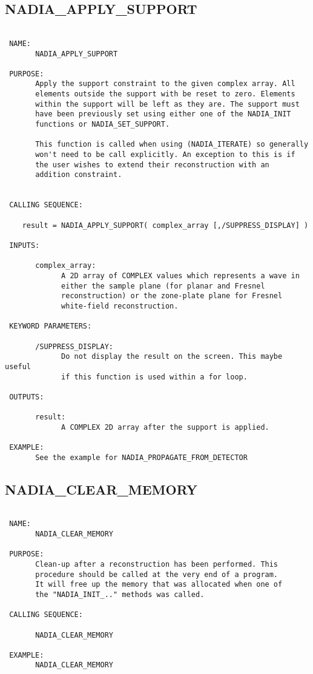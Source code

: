 \subsection{NADIA\_APPLY\_SUPPORT}
\begin{verbatim}

 NAME:
       NADIA_APPLY_SUPPORT

 PURPOSE:
       Apply the support constraint to the given complex array. All
       elements outside the support with be reset to zero. Elements
       within the support will be left as they are. The support must
       have been previously set using either one of the NADIA_INIT 
       functions or NADIA_SET_SUPPORT.

       This function is called when using (NADIA_ITERATE) so generally
       won't need to be call explicitly. An exception to this is if
       the user wishes to extend their reconstruction with an
       addition constraint.


 CALLING SEQUENCE:

	result = NADIA_APPLY_SUPPORT( complex_array [,/SUPPRESS_DISPLAY] )

 INPUTS:

       complex_array:
             A 2D array of COMPLEX values which represents a wave in
             either the sample plane (for planar and Fresnel
             reconstruction) or the zone-plate plane for Fresnel 
             white-field reconstruction.

 KEYWORD PARAMETERS:

       /SUPPRESS_DISPLAY:
             Do not display the result on the screen. This maybe useful
             if this function is used within a for loop. 

 OUTPUTS:

       result:
             A COMPLEX 2D array after the support is applied.

 EXAMPLE:
       See the example for NADIA_PROPAGATE_FROM_DETECTOR

\end{verbatim}




\subsection{NADIA\_CLEAR\_MEMORY}
\begin{verbatim}

 NAME:
       NADIA_CLEAR_MEMORY

 PURPOSE:
       Clean-up after a reconstruction has been performed. This 
       procedure should be called at the very end of a program.
       It will free up the memory that was allocated when one of 
       the "NADIA_INIT_.." methods was called.

 CALLING SEQUENCE:

       NADIA_CLEAR_MEMORY

 EXAMPLE:
       NADIA_CLEAR_MEMORY

\end{verbatim}

